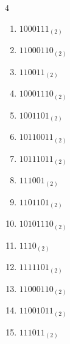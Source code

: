 \begin{multicols}{4}
\begin{enumerate}
        \phantom{$=145$}

  \item $1000111_{(2)}$

        \phantom{$=71$}

\columnbreak %

  \item $11000110_{(2)}$

        \phantom{$=198$}

  \item $110011_{(2)}$

        \phantom{$=51$}

  \item $10001110_{(2)}$

        \phantom{$=142$}

  \item $1001101_{(2)}$

        \phantom{$=77$}

  \item $10110011_{(2)}$

        \phantom{$=179$}

  \item $10111011_{(2)}$

        \phantom{$=187$}

  \item $111001_{(2)}$

        \phantom{$=57$}

  \item $1101101_{(2)}$

        \phantom{$=109$}

  \item $10101110_{(2)}$

        \phantom{$=174$}

  \item $1110_{(2)}$

        \phantom{$=14$}

  \item $1111101_{(2)}$

        \phantom{$=125$}

  \item $11000110_{(2)}$

        \phantom{$=198$}

  \item $11001011_{(2)}$

        \phantom{$=203$}

  \item $111011_{(2)}$


\end{enumerate}
\end{multicols}
